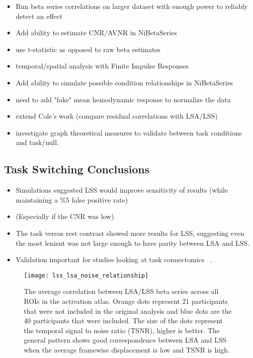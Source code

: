 \documentclass[10pt,letterpaper]{article}
\begin{document}
\begin{itemize}
  \item Run beta series correlations on larger dataset with enough power to reliably detect an effect
  \item Add ability to estimate CNR/AVNR in NiBetaSeries
  \item use t-statistic as opposed to raw beta estimates
  \item temporal/spatial analysis with Finite Impulse Responses \cite{Turner2012a}
  \item Add ability to simulate possible condition relationships in NiBetaSeries
  \item need to add "fake" mean hemodynamic response to normalize the data
  \item extend Cole's work (compare residual correlations with LSA/LSS)
  \item investigate graph theoretical measures to validate between task conditions and task/null.

\end{itemize}
\subsection*{Task Switching Conclusions}
\begin{itemize}
  \item Simulations suggested LSS would improve sensitivity of results (while maintaining a \%5 false positive rate)
  \item (Especially if the CNR was low)
  \item The task versus rest contrast showed more results for LSS,
        suggesting even the most lenient was not large enough
        to have parity between LSA and LSS.
  \item Validation important for studies looking at task connectomics ~\cite{Di2019a}.
\end{itemize}

\begin{figure}[H]
  \centering
  \texttt{[image: lss\_lsa\_noise\_relationship]}
  \caption{
    The average correlation between LSA/LSS beta series across
    all ROIs in the activation atlas.
    Orange dots represent 21 participants that were not included
    in the original analysis and blue dots are the 40
    participants that were included.
    The size of the dots represent the temporal signal to noise
    ratio (TSNR), higher is better.
    The general pattern shows good correspondence between LSA and LSS
    when the average framewise displacement is low and TSNR is high.
  }
  \label{fig:lss_lsa_correlation}
\end{figure}
\end{document}
